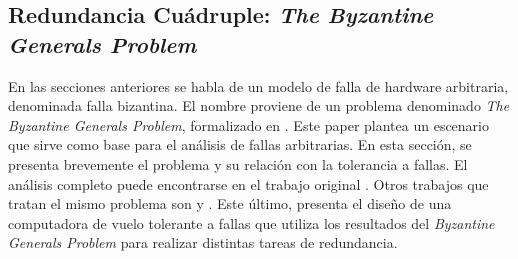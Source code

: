 



\subsection{Redundancia Cuádruple: \textit{The Byzantine Generals Problem}}

En las secciones anteriores se habla de un modelo de falla de hardware arbitraria, denominada falla bizantina. El nombre proviene de un problema denominado \textit{The Byzantine Generals Problem}, formalizado en \cite{lamport2019byzantine}. Este paper plantea un escenario que sirve como base para el análisis de fallas arbitrarias. En esta sección, se presenta brevemente el problema y su relación con la tolerancia a fallas. El análisis completo puede encontrarse en el trabajo original \cite{lamport2019byzantine}. Otros trabajos que tratan el mismo problema son \cite{pease1980reaching} y \cite{wensley1978sift}. Este último, presenta el diseño de una computadora de vuelo tolerante a fallas que utiliza los resultados del \textit{Byzantine Generals Problem} para realizar distintas tareas de redundancia.

